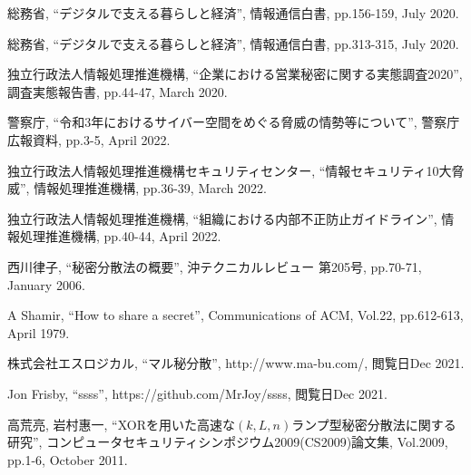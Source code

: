\documentclass[twocolumn, fleqn, uplatex]{jsarticle}
\begin{document}
\begin{thebibliography}{9}
	\footnotesize
		総務省, 
		``デジタルで支える暮らしと経済'', 
		情報通信白書, pp.156-159, July 2020.

		総務省, 
		``デジタルで支える暮らしと経済'', 
		情報通信白書, pp.313-315, July 2020.

		独立行政法人情報処理推進機構, 
		``企業における営業秘密に関する実態調査2020'', 
		調査実態報告書, pp.44-47, March 2020.
	
		警察庁, 
		``令和3年におけるサイバー空間をめぐる脅威の情勢等について'', 
		警察庁 広報資料, pp.3-5, April 2022.
	
		独立行政法人情報処理推進機構セキュリティセンター, 
		``情報セキュリティ10大脅威'', 
		情報処理推進機構, pp.36-39, March 2022.

		独立行政法人情報処理推進機構, 
		``組織における内部不正防止ガイドライン'', 
		情報処理推進機構, pp.40-44, April 2022.
	
		西川律子,
		``秘密分散法の概要'', 
		沖テクニカルレビュー 第205号, pp.70-71, January 2006.
	
		A Shamir, 
		``How to share a secret'', 
		Communications of ACM, Vol.22, pp.612-613, April 1979.
	
		株式会社エスロジカル, 
		``マル秘分散'', 
		http://www.ma-bu.com/, 
		閲覧日Dec 2021.
	
		Jon Frisby, 
		``ssss'', 
		https://github.com/MrJoy/ssss, 
		閲覧日Dec 2021.

		高荒亮, 岩村惠一, 
		``XORを用いた高速な$(k,L,n)$ランプ型秘密分散法に関する研究'', 
		コンピュータセキュリティシンポジウム2009(CS2009)論文集, Vol.2009, pp.1-6, October 2011.
	
%
\end{thebibliography}
\end{document}
